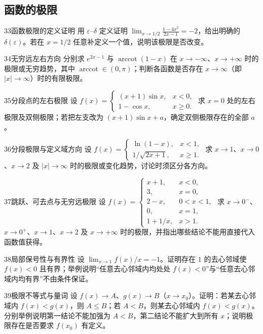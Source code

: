 \subsection{函数的极限}
\begin{exercise}{33}{函数极限的定义证明}
用 $\varepsilon$--$\delta$ 定义证明 $\lim_{x\to1/2}\frac{1-4x^2}{2x-1}=-2$，给出明确的 $\delta(\varepsilon)$。若在 $x=1/2$ 任意补定义一个值，说明该极限是否改变。
\end{exercise}
\begin{exercise}{34}{无穷远左右方向}
分别求 $e^{2x-1}$ 与 $\operatorname{arccot}(1-x)$ 在 $x\to-\infty$、$x\to+\infty$ 时的极限或无穷趋势，其中 $\operatorname{arccot}\in(0,\pi)$；判断各函数是否存在 $x\to\infty$（即 $|x|\to\infty$）时的有限极限。
\end{exercise}
\begin{exercise}{35}{分段点的左右极限}
设 $f(x)=\begin{cases}(x+1)\sin x,&x<0,\\1-\cos x,&x\ge0.\end{cases}$ 求 $x=0$ 处的左右极限及双侧极限；若把左支改为 $(x+1)\sin x+a$，确定双侧极限存在的全部 $a$。
\end{exercise}
\begin{exercise}{36}{分段极限与定义域方向}
设 $f(x)=\begin{cases}\ln(1-x),&x<1,\\1/\sqrt{2x+1},&x\ge1.\end{cases}$ 求 $x\to1$、$x\to0$、$x\to2$ 及 $|x|\to\infty$ 时的极限或变化趋势，讨论时须区分各方向。
\end{exercise}
\begin{exercise}{37}{跳跃、可去点与无穷远极限}
设 $f(x)=\begin{cases}x+1,&x<0,\\3,&x=0,\\2-x,&0<x<1,\\0,&x=1,\\1+1/x,&x>1.\end{cases}$ 求 $x\to0^-$、$x\to0^+$、$x\to1$、$x\to2$ 及 $x\to+\infty$ 时的极限，并指出哪些结论不能用直接代入函数值获得。
\end{exercise}
\begin{exercise}{38}{局部保号性与有界性}
设 $\lim_{x\to1}f(x)/x=-1$。证明存在 $1$ 的去心邻域使 $f(x)<0$ 且有界；举例说明“任意去心邻域内均处处 $f(x)<0$”与“任意去心邻域内均有界”不由条件保证。
\end{exercise}
\begin{exercise}{39}{极限不等式与量词}
设 $f(x)\to A$、$g(x)\to B$（$x\to x_0$）。证明：若某去心邻域内 $f(x)<g(x)$，则 $A\le B$；若 $A<B$，则某去心邻域内 $f(x)<g(x)$。分别举例说明第一结论不能加强为 $A<B$，第二结论不能扩大到所有 $x$；说明极限存在是否要求 $f(x_0)$ 有定义。
\end{exercise}
